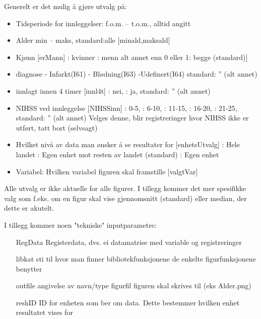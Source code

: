 \documentclass [norsk,a4paper,twoside]{article}
\begin{document}
Generelt er det mulig å gjøre utvalg på: 
\begin{itemize}
\item Tidsperiode for innleggelser: f.o.m. – t.o.m., alltid angitt 
\item Alder  min – maks, standard:alle [minald,maksald]
\item Kjønn [erMann]
	: kvinner
	: menn
	\subitem alt annet enn 0 eller 1: begge (standard)]
\item diagnose 
	- Infarkt(I61)
	- Blødning(I63)
	-Udefinert(I64) 
	\subitem	standard: '' (alt annet)
\item innlagt innen 4 timer [innl4t]
	: nei, 
	: ja, 
	\subitem	standard: '' (alt annet)
\item NIHSS ved innleggelse [NIHSSinn]
	: 0-5, 	
	: 6-10, 
	: 11-15, 
	: 16-20, 
	: 21-25, 
	\subitem	standard: '' (alt annet)
	\subitem	Velges denne, blir registreringer hvor NIHSS ikke er utført, tatt bort (selvsagt)	
\item Hvilket nivå av data man ønsker å se resultater for [enhetsUtvalg]
	: Hele landet
	: Egen enhet mot resten av landet (standard)
	: Egen enhet
\item Variabel: Hvilken variabel figuren skal framstille [valgtVar]
\end{itemize} 
	


Alle utvalg er ikke aktuelle for alle figurer. I tillegg kommer det mer spesifikke valg som f.eks. om en figur skal vise gjennomsnitt (standard) eller median, der dette er akutelt.

I tillegg kommer noen "tekniske" inputparametre:
\begin{itemize}
	\item[RegData] Registerdata, dvs. ei datamatrise med variable og registreringer
	\item[libkat] sti til hvor man finner bibliotekfunksjonene de enkelte figurfunksjonene benytter
	\item[outfile] angivelse av navn/type figurfil figuren skal skrives til (eks Alder.png)
	\item[reshID] ID for enheten som ber om data. Dette bestemmer hvilken enhet resultatet vises for
\end{itemize}
\end{document}
